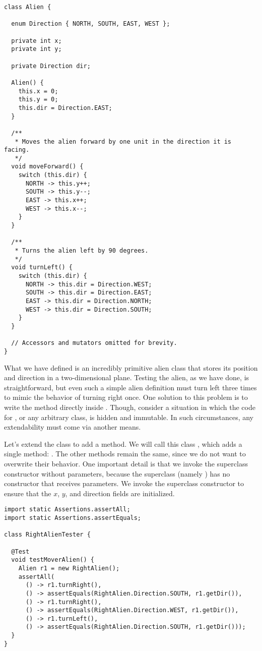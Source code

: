 \enlargethispage{2\baselineskip}
\begin{lstlisting}[language=MyJava]
class Alien {

  enum Direction { NORTH, SOUTH, EAST, WEST };

  private int x;
  private int y;

  private Direction dir;

  Alien() {
    this.x = 0;
    this.y = 0;
    this.dir = Direction.EAST;
  }

  /**
   * Moves the alien forward by one unit in the direction it is facing.
   */
  void moveForward() {
    switch (this.dir) {
      NORTH -> this.y++;
      SOUTH -> this.y--;
      EAST -> this.x++;
      WEST -> this.x--;
    }
  }

  /**
   * Turns the alien left by 90 degrees.
   */
  void turnLeft() {
    switch (this.dir) {
      NORTH -> this.dir = Direction.WEST;
      SOUTH -> this.dir = Direction.EAST;
      EAST -> this.dir = Direction.NORTH;
      WEST -> this.dir = Direction.SOUTH;
    }
  }

  // Accessors and mutators omitted for brevity.
}
\end{lstlisting}

What we have defined is an incredibly primitive alien class that stores its position and direction in a two-dimensional plane. Testing the alien, as we have done, is straightforward, but even such a simple alien definition must turn left three times to mimic the behavior of turning right once. One solution to this problem is to write the  method directly inside . Though, consider a situation in which the code for , or any arbitrary class, is hidden and immutable. In such circumstances, any extendability must come via another means. 

Let's extend the  class to add a  method. We will call this class , which adds a single method: . The other methods remain the same, since we do not want to overwrite their behavior. One important detail is that we invoke the superclass constructor without parameters, because the superclass (namely ) has no constructor that receives parameters. We invoke the superclass constructor to ensure that the $x$, $y$, and direction fields are initialized.

\begin{lstlisting}[language=MyJava]
import static Assertions.assertAll;
import static Assertions.assertEquals;

class RightAlienTester {

  @Test
  void testMoverAlien() {
    Alien r1 = new RightAlien();
    assertAll(
      () -> r1.turnRight(),
      () -> assertEquals(RightAlien.Direction.SOUTH, r1.getDir()),
      () -> r1.turnRight(),
      () -> assertEquals(RightAlien.Direction.WEST, r1.getDir()),
      () -> r1.turnLeft(),
      () -> assertEquals(RightAlien.Direction.SOUTH, r1.getDir()));
  }
}
\end{lstlisting}

